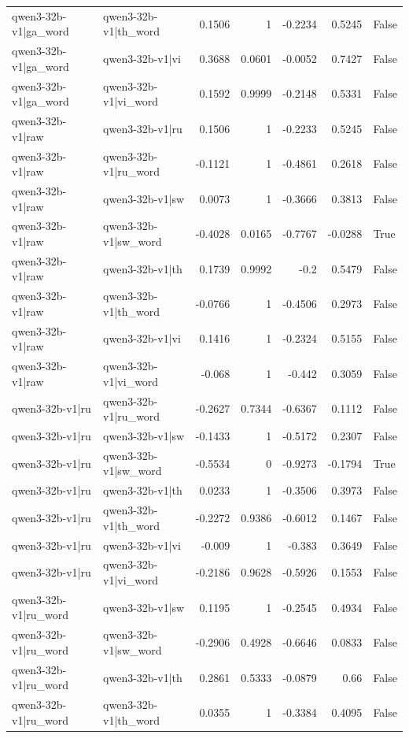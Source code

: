 \begin{table}
\begin{tabular}{l l r r r r l}
qwen3-32b-v1|ga_word & qwen3-32b-v1|th_word & 0.1506 & 1 & -0.2234 & 0.5245 & False \\
qwen3-32b-v1|ga_word & qwen3-32b-v1|vi & 0.3688 & 0.0601 & -0.0052 & 0.7427 & False \\
qwen3-32b-v1|ga_word & qwen3-32b-v1|vi_word & 0.1592 & 0.9999 & -0.2148 & 0.5331 & False \\
qwen3-32b-v1|raw & qwen3-32b-v1|ru & 0.1506 & 1 & -0.2233 & 0.5245 & False \\
qwen3-32b-v1|raw & qwen3-32b-v1|ru_word & -0.1121 & 1 & -0.4861 & 0.2618 & False \\
qwen3-32b-v1|raw & qwen3-32b-v1|sw & 0.0073 & 1 & -0.3666 & 0.3813 & False \\
qwen3-32b-v1|raw & qwen3-32b-v1|sw_word & -0.4028 & 0.0165 & -0.7767 & -0.0288 & True \\
qwen3-32b-v1|raw & qwen3-32b-v1|th & 0.1739 & 0.9992 & -0.2 & 0.5479 & False \\
qwen3-32b-v1|raw & qwen3-32b-v1|th_word & -0.0766 & 1 & -0.4506 & 0.2973 & False \\
qwen3-32b-v1|raw & qwen3-32b-v1|vi & 0.1416 & 1 & -0.2324 & 0.5155 & False \\
qwen3-32b-v1|raw & qwen3-32b-v1|vi_word & -0.068 & 1 & -0.442 & 0.3059 & False \\
qwen3-32b-v1|ru & qwen3-32b-v1|ru_word & -0.2627 & 0.7344 & -0.6367 & 0.1112 & False \\
qwen3-32b-v1|ru & qwen3-32b-v1|sw & -0.1433 & 1 & -0.5172 & 0.2307 & False \\
qwen3-32b-v1|ru & qwen3-32b-v1|sw_word & -0.5534 & 0 & -0.9273 & -0.1794 & True \\
qwen3-32b-v1|ru & qwen3-32b-v1|th & 0.0233 & 1 & -0.3506 & 0.3973 & False \\
qwen3-32b-v1|ru & qwen3-32b-v1|th_word & -0.2272 & 0.9386 & -0.6012 & 0.1467 & False \\
qwen3-32b-v1|ru & qwen3-32b-v1|vi & -0.009 & 1 & -0.383 & 0.3649 & False \\
qwen3-32b-v1|ru & qwen3-32b-v1|vi_word & -0.2186 & 0.9628 & -0.5926 & 0.1553 & False \\
qwen3-32b-v1|ru_word & qwen3-32b-v1|sw & 0.1195 & 1 & -0.2545 & 0.4934 & False \\
qwen3-32b-v1|ru_word & qwen3-32b-v1|sw_word & -0.2906 & 0.4928 & -0.6646 & 0.0833 & False \\
qwen3-32b-v1|ru_word & qwen3-32b-v1|th & 0.2861 & 0.5333 & -0.0879 & 0.66 & False \\
qwen3-32b-v1|ru_word & qwen3-32b-v1|th_word & 0.0355 & 1 & -0.3384 & 0.4095 & False \\

\end{tabular}
\end{table}
